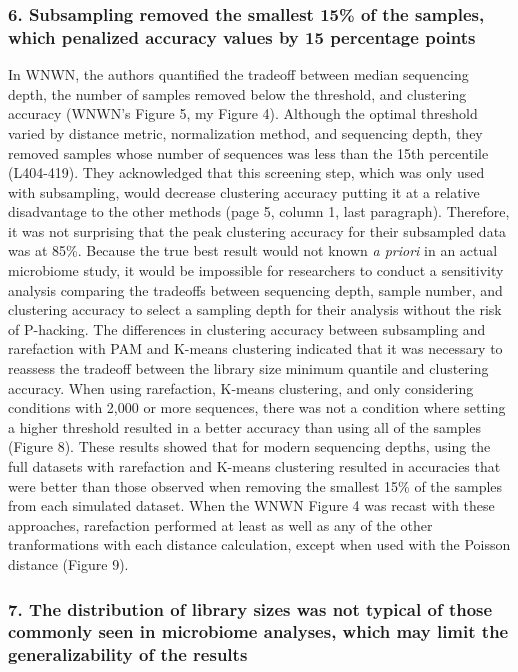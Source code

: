 \documentclass[
]{article}
\begin{document}
\hypertarget{subsampling-removed-the-smallest-15-of-the-samples-which-penalized-accuracy-values-by-15-percentage-points}{%
\subsubsection{6. Subsampling removed the smallest 15\% of the samples,
which penalized accuracy values by 15 percentage
points}\label{subsampling-removed-the-smallest-15-of-the-samples-which-penalized-accuracy-values-by-15-percentage-points}}

In WNWN, the authors quantified the tradeoff between median sequencing
depth, the number of samples removed below the threshold, and clustering
accuracy (WNWN's Figure 5, my Figure 4). Although the optimal threshold
varied by distance metric, normalization method, and sequencing depth,
they removed samples whose number of sequences was less than the 15th
percentile (L404-419). They acknowledged that this screening step, which
was only used with subsampling, would decrease clustering accuracy
putting it at a relative disadvantage to the other methods (page 5,
column 1, last paragraph). Therefore, it was not surprising that the
peak clustering accuracy for their subsampled data was at 85\%. Because
the true best result would not known \emph{a priori} in an actual
microbiome study, it would be impossible for researchers to conduct a
sensitivity analysis comparing the tradeoffs between sequencing depth,
sample number, and clustering accuracy to select a sampling depth for
their analysis without the risk of P-hacking. The differences in
clustering accuracy between subsampling and rarefaction with PAM and
K-means clustering indicated that it was necessary to reassess the
tradeoff between the library size minimum quantile and clustering
accuracy. When using rarefaction, K-means clustering, and only
considering conditions with 2,000 or more sequences, there was not a
condition where setting a higher threshold resulted in a better accuracy
than using all of the samples (Figure 8). These results showed that for
modern sequencing depths, using the full datasets with rarefaction and
K-means clustering resulted in accuracies that were better than those
observed when removing the smallest 15\% of the samples from each
simulated dataset. When the WNWN Figure 4 was recast with these
approaches, rarefaction performed at least as well as any of the other
tranformations with each distance calculation, except when used with the
Poisson distance (Figure 9).

\hypertarget{the-distribution-of-library-sizes-was-not-typical-of-those-commonly-seen-in-microbiome-analyses-which-may-limit-the-generalizability-of-the-results}{%
\subsubsection{7. The distribution of library sizes was not typical of
those commonly seen in microbiome analyses, which may limit the
generalizability of the
results}\label{the-distribution-of-library-sizes-was-not-typical-of-those-commonly-seen-in-microbiome-analyses-which-may-limit-the-generalizability-of-the-results}}
\end{document}
